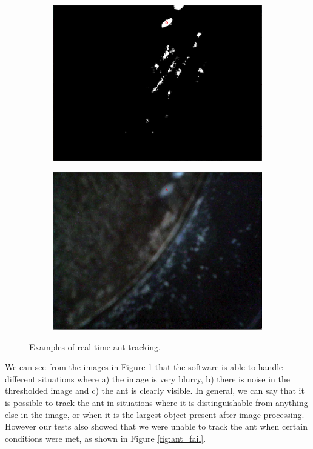 \begin{figure}
\begin{subfigure}[b]{0.35\textwidth}
                \caption{}
        \end{subfigure}\\ \mbox{}\\
        \begin{subfigure}[b]{0.35\textwidth}
                \includegraphics[scale = 0.3]{img/good4t}
                \caption{}
        \end{subfigure}
		\quad
        \begin{subfigure}[b]{0.35\textwidth}
                \includegraphics[scale = 0.3]{img/good4}
                \caption{}
        \end{subfigure}
		\caption{Examples of real time ant tracking.}
		\label{fig:ant_tracking}
\end{figure}

We can see from the images in Figure \ref{fig:ant_tracking} that the software is able to handle different situations where a) the image is very blurry, b) there is noise in the thresholded image and c) the ant is clearly visible. In general, we can say that it is possible to track the ant in situations where it is distinguishable from anything else in the image, or when it is the largest object present after image processing. However our tests also showed that we were unable to track the ant when certain conditions were met, as shown in Figure \ref{fig:ant_fail}.\\

